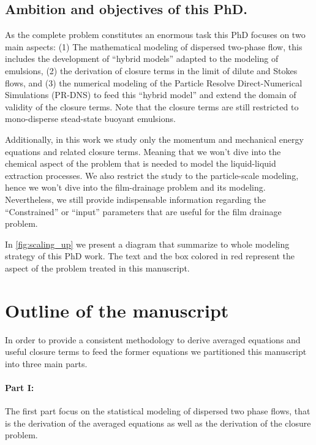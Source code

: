 \subsection{Ambition and objectives of this PhD.}




As the complete problem constitutes an enormous task this PhD focuses on two main aspects: 
(1) The mathematical modeling of dispersed two-phase flow, this includes the development of ``hybrid models'' adapted to the modeling of emulsions, 
(2) the derivation of closure terms in the limit of dilute and Stokes flows,  
and (3) the numerical modeling of the Particle Resolve Direct-Numerical Simulations (PR-DNS) to feed this ``hybrid model'' and extend the domain of validity of the closure terms. 
Note that the closure terms are still restricted to mono-disperse stead-state buoyant emulsions. 

Additionally, in this work we study only the momentum and mechanical energy equations and related closure terms. 
Meaning that we won't dive into the chemical aspect of the problem that is needed to model the liquid-liquid extraction processes. 
We also restrict the study to the particle-scale modeling, hence we won't dive into the film-drainage problem and its modeling.   
Nevertheless, we still provide indispensable information regarding the ``Constrained'' or ``input'' parameters that are useful for the film drainage problem. 

In \ref{fig:scaling_up} we present a diagram that summarize to whole modeling strategy of this PhD work. 
The text and the box colored in red represent the aspect of the problem treated in this manuscript. 


\section{Outline of the manuscript}


In order to provide a consistent methodology to derive averaged equations and useful closure terms to feed the former equations we partitioned this manuscript into three main parts. 

\paragraph*{Part I:} 
The first part focus on the statistical modeling of dispersed two phase flows, that is the derivation of the averaged equations as well as the derivation of the closure problem. 

